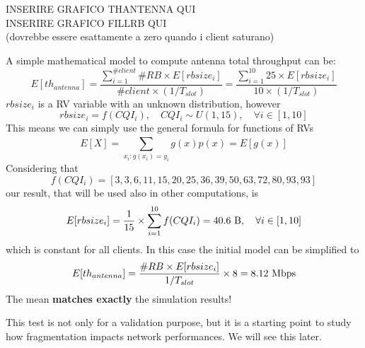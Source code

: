 \begin{center}
	INSERIRE GRAFICO THANTENNA QUI\\
	INSERIRE GRAFICO FILLRB QUI\\
	(dovrebbe essere esattamente a zero quando i client saturano)
\end{center}

A simple mathematical model to compute antenna total throughput can be:
\begin{equation}
	E[th_{antenna}] = \frac{\sum\limits_{i=1}^{\#client} \#RB \times E[rbsize_i]}{\#client\times(1/T_{slot})} = \frac{\sum\limits_{i=1}^{10} 25 \times E[rbsize_i]}{10 \times (1/T_{slot})}
\end{equation}
\(rbsize_i\) is a RV variable with an unknown distribution, however
\begin{equation}
	 rbsize_i = f(CQI_i), \quad CQI_i\sim U(1,15), \quad \forall i \in [1,10]
\end{equation}
This means we can simply use the general formula for functions of RVs
\begin{equation}
	E[X] = \sum_{x_i : g(x_i)=y_i}^{} g(x)p(x) = E[g(x)]
\end{equation}
Considering that
\[f(CQI_i) = [3,3,6,11,15,20,25,36,39,50,63,72,80,93,93] \]
our result, that will be used also in other computations, is
\begin{equation}
	E[rbsize_i] = \frac{1}{15} \times \sum_{i=1}^{10} f(CQI_i) =40.6 \textnormal{ B}, \quad \forall i \in [1,10]
\end{equation}
which is constant for all clients. In this case the initial model can be simplified to
\begin{equation}
E[th_{antenna}] = \frac{\#RB \times E[rbsize_i]}{1/T_{slot}} \times 8 = 8.12 \textnormal{ Mbps}
\end{equation}
The mean \textbf{matches exactly} the simulation results!

This test is not only for a validation purpose, but it is a starting point to study how fragmentation impacts network performances. We will see this later.